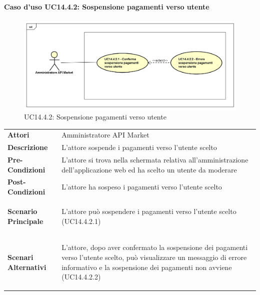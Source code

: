 \newpage
\paragraph{Caso d'uso UC14.4.2: Sospensione pagamenti verso utente}
\label{UC14_4_2}
\begin{figure}[ht]
	\centering
	\includegraphics[scale=0.45]{UML/UC14_4_2.png}
	\caption{UC14.4.2: Sospensione pagamenti verso utente}
\end{figure}

\begin{minipage}{\linewidth}
	\begin{tabular}{ l | p{11cm}}
		\hline
		\rowcolor{Gray}
		\multicolumn{2}{c}{UC14.4.2 - Sospensione pagamenti verso utente} \\
		\hline
		\textbf{Attori} & Amministratore API Market \\
		\textbf{Descrizione} & L'attore sospende i pagamenti verso l'utente scelto \\
		\textbf{Pre-Condizioni} & L'attore si trova nella schermata relativa all'amministrazione dell'applicazione web ed ha scelto un utente da moderare \\
		\textbf{Post-Condizioni} & L'attore ha sospeso i pagamenti verso l'utente scelto \\
		\textbf{Scenario Principale} & 
		\begin{enumerate*}[label=(\arabic*.),itemjoin={\newline}]
			\item L'attore può sospendere i pagamenti verso l'utente scelto (UC14.4.2.1)
		\end{enumerate*}\\
		\textbf{Scenari Alternativi} & 
		\begin{enumerate*}[label=(\arabic*.),itemjoin={\newline}]
			\item L'attore, dopo aver confermato la sospensione dei pagamenti verso l'utente scelto, può visualizzare un messaggio di errore informativo e la sospensione dei pagamenti non avviene (UC14.4.2.2)
		\end{enumerate*}\\
	\end{tabular}
\end{minipage}

